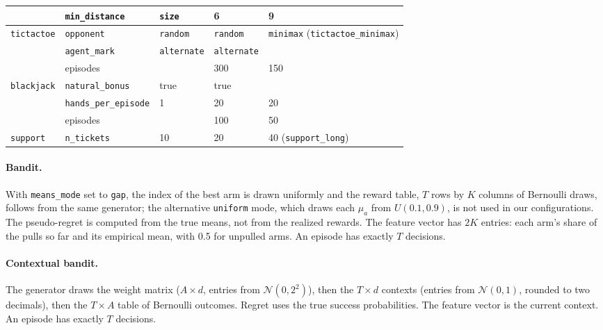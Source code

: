 \begin{table}[h]
\begin{tabularx}{\linewidth}{@{}l l l l X@{}}
 & \texttt{min\_distance} & \texttt{size} & 6 & 9\\
\midrule
\texttt{tictactoe} & \texttt{opponent} & \texttt{random} & \texttt{random} & \texttt{minimax} (\texttt{tictactoe\_minimax})\\
 & \texttt{agent\_mark} & \texttt{alternate} & \texttt{alternate} & \\
 & episodes & & 300 & 150\\
\midrule
\texttt{blackjack} & \texttt{natural\_bonus} & true & true & \\
 & \texttt{hands\_per\_episode} & 1 & 20 & 20\\
 & episodes & & 100 & 50\\
\midrule
\texttt{support} & \texttt{n\_tickets} & 10 & 20 & 40 (\texttt{support\_long})\\
\bottomrule
\end{tabularx}
\end{table}

\paragraph{Bandit.}
With \texttt{means\_mode} set to \texttt{gap}, the index of the best arm is drawn uniformly and the reward table, $T$ rows by $K$ columns of Bernoulli draws, follows from the same generator; the alternative \texttt{uniform} mode, which draws each $\mu_a$ from $U(0.1, 0.9)$, is not used in our configurations. The pseudo-regret is computed from the true means, not from the realized rewards. The feature vector has $2K$ entries: each arm's share of the pulls so far and its empirical mean, with 0.5 for unpulled arms. An episode has exactly $T$ decisions.

\paragraph{Contextual bandit.}
The generator draws the weight matrix ($A\times d$, entries from $\mathcal{N}(0, 2^2)$), then the $T\times d$ contexts (entries from $\mathcal{N}(0,1)$, rounded to two decimals), then the $T\times A$ table of Bernoulli outcomes. Regret uses the true success probabilities. The feature vector is the current context. An episode has exactly $T$ decisions.


